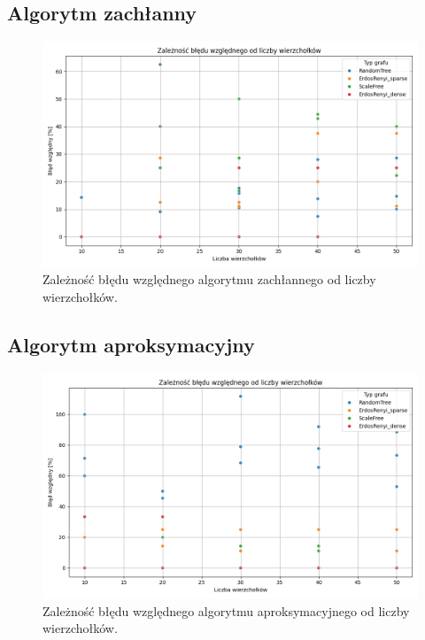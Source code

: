 \subsection{Algorytm zachłanny}

\begin{figure}[H]
    \centering
    \includegraphics[width=\textwidth]{assets/plots_approx/greedy.png}
    \caption{Zależność błędu względnego algorytmu zachłannego od liczby wierzchołków.}
    \label{fig:greedyPlot}
\end{figure}

\subsection{Algorytm aproksymacyjny}

\begin{figure}[H]
    \centering
    \includegraphics[width=\textwidth]{assets/plots_approx/approx.png}
    \caption{Zależność błędu względnego algorytmu aproksymacyjnego od liczby wierzchołków.}
    \label{fig:approxPlot}
\end{figure}

